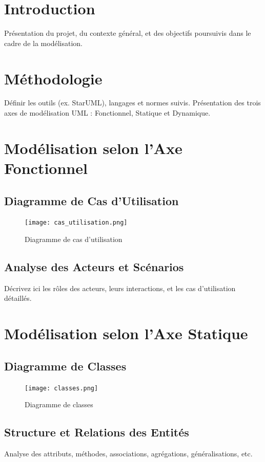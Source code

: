 \documentclass{article}
\begin{document}
\section{Introduction}
Présentation du projet, du contexte général, et des objectifs poursuivis dans le cadre de la modélisation.

\section{Méthodologie}
Définir les outils (ex. StarUML), langages et normes suivis. Présentation des trois axes de modélisation UML : Fonctionnel, Statique et Dynamique.

\section{Modélisation selon l'Axe Fonctionnel}
\subsection{Diagramme de Cas d’Utilisation}
\begin{figure}[H]
    \centering
    \texttt{[image: cas\_utilisation.png]}
    \caption{Diagramme de cas d’utilisation}
\end{figure}

\subsection{Analyse des Acteurs et Scénarios}
Décrivez ici les rôles des acteurs, leurs interactions, et les cas d'utilisation détaillés.

\section{Modélisation selon l'Axe Statique}
\subsection{Diagramme de Classes}
\begin{figure}[H]
    \centering
    \texttt{[image: classes.png]}
    \caption{Diagramme de classes}
\end{figure}

\subsection{Structure et Relations des Entités}
Analyse des attributs, méthodes, associations, agrégations, généralisations, etc.
\end{document}

